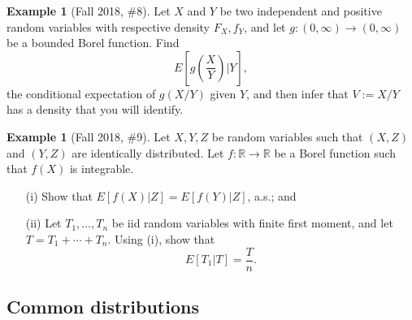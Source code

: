 \documentclass[12pt,reqno]{article}
\theoremstyle{plain}
\theoremstyle{definition}
\newtheorem{example}[theorem]{Example}
\begin{document}
\begin{example}[Fall 2018, \#8]
Let $X$ and $Y$ be two independent and positive random variables with 
respective density $F_X,f_Y$, and let $g: (0, \infty) \rightarrow (0, \infty)$ 
be a bounded Borel function. Find 
\[
E\left[g\left(\frac{X}{Y}\right) \Bigr\rvert Y\right], 
\]
the conditional expectation of $g(X/Y)$ given $Y$, and then infer that 
$V := X/Y$ has a density that you will identify. 
\end{example} 

\begin{example}[Fall 2018, \#9]
Let $X,Y,Z$ be random variables such that $(X,Z)$ and $(Y,Z)$ are 
identically distributed. Let $f: \mathbb{R} \rightarrow \mathbb{R}$ be 
a Borel function such that $f(X)$ is integrable. 
\begin{itemize} 

\item[(i)] Show that $E[f(X) | Z] = E[f(Y) | Z]$, a.s.; and 
\item[(ii)] Let $T_1,\ldots,T_n$ be iid random variables with finite 
     first moment, and let $T = T_1+\cdots+T_n$. Using (i), show that 
     \[
     E[T_1|T] = \frac{T}{n}. 
     \]
     
\end{itemize} 
\end{example} 

\subsection{Common distributions}
\end{document}
